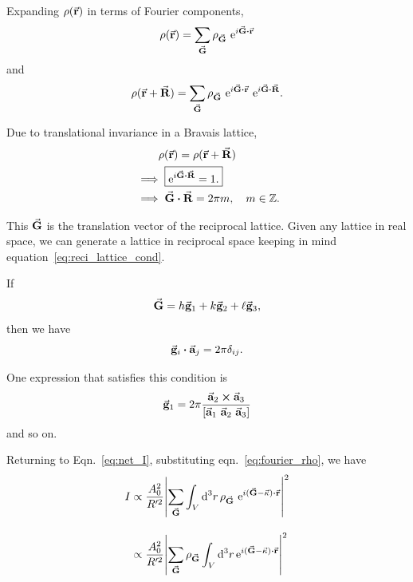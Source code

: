 	Expanding $\rho(\va{r})$ in terms of Fourier components,%
%		
	\begin{equation}
	\rho(\va{r}) = \sum_{\va{G}} \rho_{\va{G}} ~ \e{ i \va{G} \vdot \va{r} } \label{eq:fourier_rho}
	\end{equation}
%	
	and%
%	
	\begin{equation}
	\rho(\va{r} + \va{R}) = \sum_{\va{G}} \rho_{\va{G}} ~ \e{ i \va{G} \vdot \va{r} } ~ \e{ i \va{G} \vdot \va{R} }.
	\end{equation}
	
	Due to translational invariance in a Bravais lattice,%
%	
	\begin{align}
	&\phantom{\implies} \rho (\va{r}) = \rho( \va{r} + \va{R} ) \nonumber \\
	&\implies \boxed{ \e{i \va{G} \vdot \va{R} } = 1.} \\ \label{eq:reci_lattice_cond}
	&\implies \va{G} \vdot \va{R} = 2\pi m, \quad m \in \mathbb{Z}.
	\end{align}
	
	This $\va{G}$ is the translation vector of the reciprocal lattice. Given any lattice in real space, we can generate a lattice in reciprocal space keeping in mind equation~\eqref{eq:reci_lattice_cond}.
	
	If%
%	
	\begin{equation}
	\va{G} = h \va{g}_1 + k \va{g}_2 + \ell \va{g}_3,\label{eq:reci_lattice_vec}
	\end{equation}%
%	
	then we have%
%	
	\begin{equation}
	\va{g}_i \vdot \va{a}_j = 2\pi \delta_{ij}.\label{eq:relation_g_a}
	\end{equation}%
	
	One expression that satisfies this condition is%
%	
	\begin{equation}
	\va{g}_1 = 2\pi \dfrac{\va{a}_2 \cross \va{a}_3}{\qty[ \va{a}_1 ~ \va{a}_2 ~ \va{a}_3 ]} \label{eq:g_from_a}
	\end{equation}%
%	
	and so on.
	
	Returning to Eqn.~\eqref{eq:net_I}, substituting eqn.~\eqref{eq:fourier_rho}, we have%
%	
	\begin{align}
	I &\propto \dfrac{A_0^2}{R'^2} \abs{ \sum_{\va{G}} \int_V \dd[3]{r} \rho_{\va{G}} ~ \e{ i (\va{G} - \va{\kappa}) \vdot \va{r} } }  ^2 \nonumber \\[1em]
	  &\propto \dfrac{A_0^2}{R'^2} \abs{ \sum_{\va{G}} \rho_{\va{G}} \int_V \dd[3]{r} \e{ i (\va{G} - \va{\kappa}) \vdot \va{r} } }^2
	\end{align}%
	
